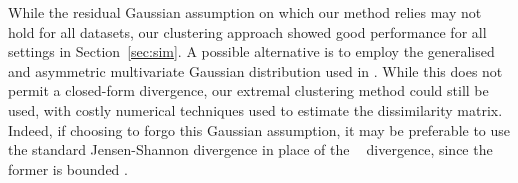 \documentclass[12pt,compact]{article}
\DeclareMathOperator{\JS}{JS}
\newcommand{\JSGa}{\mathop{\mathrm{JS}^{\mathrm{G}_{\lambda}}}\nolimits}
\begin{document}
While the residual Gaussian assumption on which our method relies may not hold for all datasets, our clustering approach showed good performance for all settings in Section~\ref{sec:sim}.
A possible alternative is to employ the generalised and asymmetric multivariate Gaussian distribution used in \citet{Farrell2025}. 
While this does not permit a closed-form divergence, our extremal clustering method could still be used, with costly numerical techniques used to estimate the dissimilarity matrix.
Indeed, if choosing to forgo this Gaussian assumption, it may be preferable to use the standard Jensen-Shannon divergence in place of the $\JSGa{}$ divergence, since the former is bounded \citep{Thiagarajan2025}.
\end{document}
